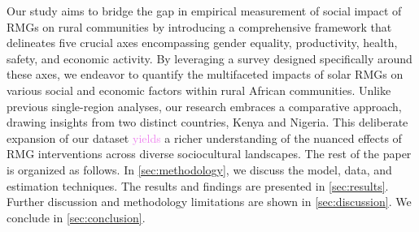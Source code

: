 Our study aims to bridge the gap in empirical measurement of social impact of RMGs on rural communities by introducing a comprehensive framework that delineates five crucial axes encompassing gender equality, productivity, health, safety, and economic activity. By leveraging a survey designed specifically around these axes, we endeavor to quantify the multifaceted impacts of solar RMGs on various social and economic factors within rural African communities. Unlike previous single-region analyses, our research embraces a comparative approach, drawing insights from two distinct countries, Kenya and Nigeria. This deliberate expansion of our dataset \textcolor{violet}{yields} a richer understanding of the nuanced effects of RMG interventions across diverse sociocultural landscapes. The rest of the paper is organized as follows. In \cref{sec:methodology}, we discuss the model, data, and estimation techniques. The results and findings are presented in \cref{sec:results}. Further discussion and methodology limitations are shown in \cref{sec:discussion}. We conclude in \cref{sec:conclusion}.